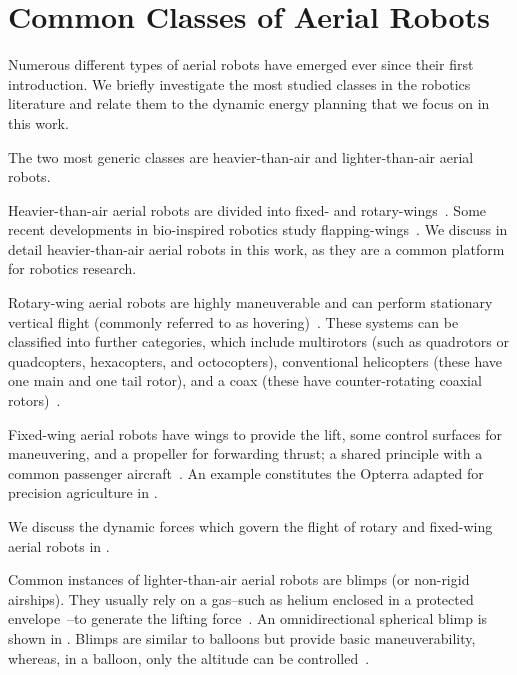 \section{Common Classes of Aerial Robots}
\label{sec:aerial-robo-types}

Numerous different types of aerial robots have emerged ever since their first introduction. We briefly investigate the most studied classes in the robotics literature and relate them to the dynamic energy planning that we focus on in this work. 

The two most generic classes are heavier-than-air and lighter-than-air aerial robots.

Heavier-than-air aerial robots are divided into fixed- and rotary-wings~\citep{siciliano2016springer}. Some recent developments in bio-inspired robotics study flapping-wings~\citep{floreano2015science}. We discuss in detail heavier-than-air aerial robots in this work, as they are a common platform for robotics research. 

Rotary-wing aerial robots are highly maneuverable and can perform stationary vertical flight (commonly referred to as hovering)~\citep{siciliano2016springer}. These systems can be classified into further categories, which include multirotors (such as quadrotors or quadcopters, hexacopters, and octocopters), conventional helicopters (these have one main and one tail rotor), and a coax (these have counter-rotating coaxial rotors)~\citep{corke2017robotics}.

Fixed-wing aerial robots have wings to provide the lift, some control surfaces for maneuvering, and a propeller for forwarding thrust; a shared principle with a common passenger aircraft~\citep{corke2017robotics}. An example constitutes the Opterra adapted for precision agriculture in .

We discuss the dynamic forces which govern the flight of rotary and fixed-wing aerial robots in .

Common instances of lighter-than-air aerial robots are blimps (or non-rigid airships). They usually rely on a gas--such as helium enclosed in a protected envelope~\citep{burri2013design}--to generate the lifting force~\citep{fui2017recent}. An omnidirectional spherical blimp is shown in . Blimps are similar to balloons but provide basic maneuverability, whereas, in a balloon, only the altitude can be controlled~\citep{colombatti2011lighter}.

